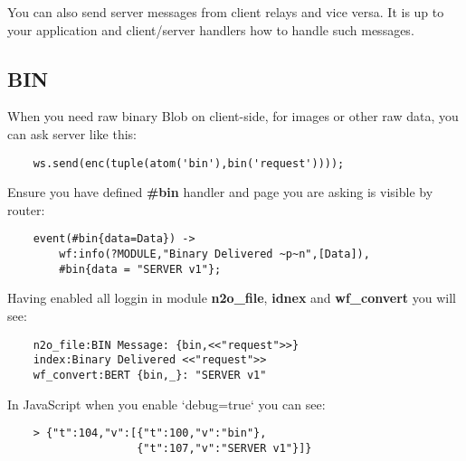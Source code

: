 You can also send server messages from client relays and vice versa.
It is up to your application and client/server handlers how to handle such messages.

\newpage
\subsection{BIN}

When you need raw binary Blob on client-side,
for images or other raw data, you can ask server like this:

\vspace{1\baselineskip}
\begin{lstlisting}
    ws.send(enc(tuple(atom('bin'),bin('request'))));
\end{lstlisting}
\vspace{1\baselineskip}

Ensure you have defined {\bf \#bin} handler and page you are
asking is visible by router:

\vspace{1\baselineskip}
\begin{lstlisting}
    event(#bin{data=Data}) ->
        wf:info(?MODULE,"Binary Delivered ~p~n",[Data]),
        #bin{data = "SERVER v1"};
\end{lstlisting}
\vspace{1\baselineskip}

Having enabled all loggin in module {\bf n2o\_file}, {\bf idnex} and {\bf wf\_convert}
you will see:

\vspace{1\baselineskip}
\begin{lstlisting}
    n2o_file:BIN Message: {bin,<<"request">>}
    index:Binary Delivered <<"request">>
    wf_convert:BERT {bin,_}: "SERVER v1"
\end{lstlisting}
\vspace{1\baselineskip}

In JavaScript when you enable `debug=true` you can see:

\vspace{1\baselineskip}
\begin{lstlisting}
    > {"t":104,"v":[{"t":100,"v":"bin"},
                    {"t":107,"v":"SERVER v1"}]}
\end{lstlisting}
\vspace{1\baselineskip}

